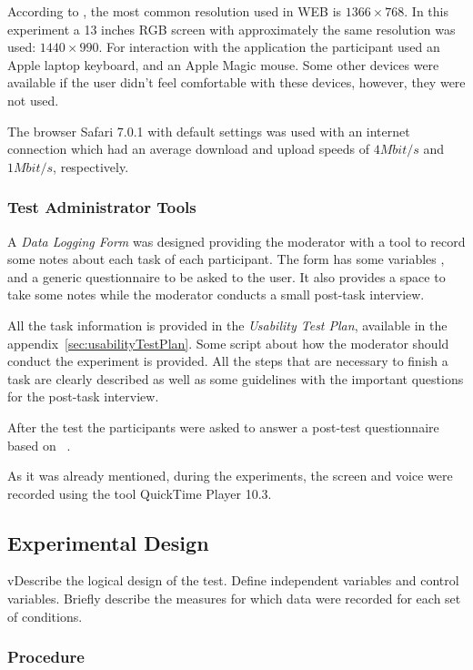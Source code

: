 \documentclass[a4paper]{article}
\begin{document}
According to \citep{http://www.satya-weblog.com/2013/07/desktop-laptop-mobile-screen-resolution-most-common-worldwide.html}, the most common resolution used in WEB is $1366\times 768$. In this experiment a 13 inches RGB screen with approximately the same resolution was used: $1440\times 990$. For interaction with the application the participant used an Apple laptop keyboard, and an Apple Magic mouse. Some other devices were available if the user didn't feel comfortable with these devices, however, they were not used.

The browser Safari 7.0.1 with default settings was used with an internet connection which had an average download and upload speeds of $4 Mbit/s$ and $1Mbit/s$, respectively.


\subsubsection{Test Administrator Tools}

A \emph{Data Logging Form} was designed providing the moderator with a tool to record some notes about each task of each participant. The form has some variables , and a generic questionnaire to be asked to the user. It also provides a space to take some notes while the moderator conducts a small post-task interview.

All the task information is provided in the \emph{Usability Test Plan}, available in the appendix~\ref{sec:usabilityTestPlan}. Some script about how the moderator should conduct the experiment is provided. All the steps that are necessary to finish a task are clearly described as well as some guidelines with the important questions for the post-task interview.

After the test the participants were asked to answer a post-test questionnaire based on~\citep{post test} .

As it was already mentioned, during the experiments, the screen and voice were recorded using the tool QuickTime Player 10.3.

\subsection{Experimental Design}
vDescribe the logical design of the test. Define independent variables and control variables. Briefly describe the measures for which data were recorded for each set of conditions.

\subsubsection{Procedure}
\end{document}
